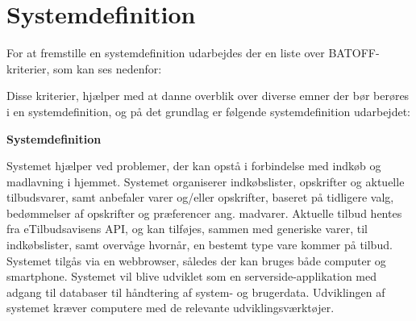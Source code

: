 \chapter{Systemdefinition}

For at fremstille en systemdefinition udarbejdes der en liste over BATOFF-kriterier\citep{OOA&D2001}, som kan ses nedenfor:



Disse kriterier, hjælper med at danne overblik over diverse emner der bør berøres i en systemdefinition, og på det grundlag er følgende systemdefinition udarbejdet:

\textbf{Systemdefinition}

Systemet hjælper ved problemer, der kan opstå i forbindelse med indkøb og madlavning i hjemmet. Systemet organiserer indkøbslister, opskrifter og aktuelle tilbudsvarer, samt anbefaler varer og/eller opskrifter, baseret på tidligere valg, bedømmelser af opskrifter og præferencer ang. madvarer. Aktuelle tilbud hentes fra eTilbudsavisens API, og kan tilføjes, sammen med generiske varer, til indkøbslister, samt overvåge hvornår, en bestemt type vare kommer på tilbud.
Systemet tilgås via en webbrowser, således der kan bruges både computer og smartphone. Systemet vil blive udviklet som en serverside-applikation med adgang til databaser til håndtering af system- og brugerdata. Udviklingen af systemet kræver computere med de relevante udviklingsværktøjer. 